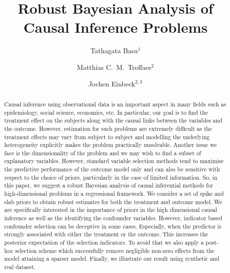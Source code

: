 \documentclass{amsart}
\begin{document}
\title{Robust Bayesian Analysis of Causal Inference Problems}
\author{Tathagata Basu$^1$}
\author{Matthias C.~M.~Troffaes$^2$}
\author{Jochen Einbeck$^{2,3}$}
\address{$^1$UMR CNRS 7253 Heudiasyc, Universit\'{e} de Technologie de
Compi\`{e}gne}
\address{$^2$Department of Mathematical Sciences, Durham University}
\address{$^3$Durham Research Methods Centre}

\begin{abstract}
Causal inference using observational data is an important aspect in
many fields such as epidemiology, social science, economics, etc. In
particular, our goal is to find the treatment effect on the subjects
along with the causal links between the variables and the outcome.
However, estimation for such problems are extremely 
difficult as the treatment effects may vary from subject 
to subject and modelling the underlying heterogeneity explicitly makes the 
problem practically unsolvable. Another issue we face is the 
dimensionality of the problem and we may wish to find a subset of 
explanatory variables. However, standard variable selection methods
tend to maximise the predictive performance of the outcome model only and
can also be sensitive with respect to the choice of priors, particularly 
in the case of limited information. So, in this paper, we suggest a 
robust Bayesian analysis of causal inferential methods for 
high-dimensional problems in a regressional framework. We consider
a set of spike and slab priors to obtain robust estimates for
both the treatment and outcome model. We are specifically interested 
in the importance of priors in the high dimensional causal inference
as well as the identifying the confounder variables. However, indicator
based confounder selection can be deceptive in some cases. Especially, 
when the predictor is strongly associated with either the treatment or 
the outcome. This increases the posterior expectation of the selection
indicators. To avoid that we also apply a post-hoc selection scheme
which successfully remove negligible non-zero effects from the model
attaining a sparser model. Finally, we illustrate
our result using synthetic \alert{and real} dataset.

\end{abstract}

\maketitle
\end{document}
